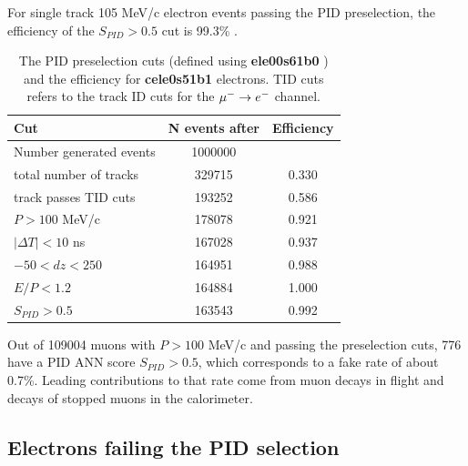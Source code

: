 For single track 105 MeV/c electron events passing the PID preselection, the efficiency
of the $S_{PID} > 0.5$ cut is 99.3\% .
\begin{table}[H]
  \begin{center}
    \begin{tabular}{l|c|c} %
      \textbf{Cut}                    & \textbf{N events after } & \textbf{Efficiency }\\
      \hline
      Number generated events         & 1000000                  &            \\
      total number of tracks          &  329715                  &   0.330    \\
      \hline                                                     
      track passes TID cuts           &  193252                  &   0.586    \\
      $P > 100$ MeV/c                 &  178078                  &   0.921    \\
      $|\Delta{T}| < 10$ ns           &  167028                  &   0.937     \\
      $-50 < dz < 250$                &  164951                  &   0.988    \\
      $ E/P < 1.2$                    &  164884                  &   1.000    \\
      \hline                                                     
      $S_{PID} >0.5$                   &  163543                  &   0.992    \\
   \end{tabular}
  \end{center}
  \caption{
    \label{tab:pid_preselection_cuts}
    The PID preselection cuts (defined using {\bf ele00s61b0} ) and the efficiency for {\bf cele0s51b1} electrons.
    TID cuts refers to the track ID cuts for the $\mbox{$\mu^- \rightarrow e^-$}$ channel.
    \\
  }
\end{table}

Out of 109004 muons with $P > 100$ MeV/c and passing the preselection cuts, 776 have a PID ANN score $S_{PID} > 0.5$,
which corresponds to a fake rate of about 0.7\%. Leading contributions to that rate come from muon decays in flight 
and decays of stopped muons in the calorimeter.

\subsection { Electrons failing the PID selection}
\label{sec:electrons_failing_pid}

